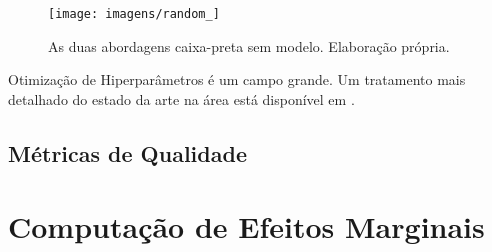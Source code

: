 \begin{figure}[H]
    \centering
    \texttt{[image: imagens/random\_]}
    \caption{As duas abordagens caixa-preta sem modelo. Elaboração própria.}
\end{figure}



Otimização de Hiperparâmetros é um campo grande. Um tratamento mais detalhado do estado da arte na área está disponível em .

\subsection{Métricas de Qualidade}





\section{Computação de Efeitos Marginais}
